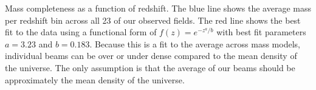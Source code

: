 \label{fig:mass_complete} Mass completeness as a function of redshift. The blue line shows the average mass per redshift bin across all 23 of our observed fields. The red line shows the best fit to the data using a functional form of $f(z) = e^{-z^a / b}$ with best fit parameters $a = 3.23$ and $b = 0.183$. Because this is a fit to the average across mass models, individual beams can be over or under dense compared to the mean density of the universe. The only assumption is that the average of our beams should be approximately the mean density of the universe.
  